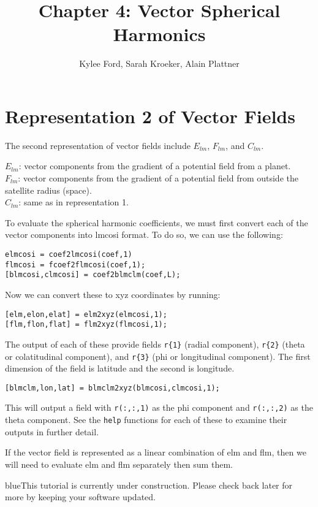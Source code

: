 \documentclass[11pt]{article}
\title{Chapter 4: Vector Spherical Harmonics}
\author{Kylee Ford, Sarah Kroeker, Alain Plattner}
\newcommand{\TAG}{\begin{color}{blue}This tutorial is currently under construction. Please check back later for more by keeping your software updated.\end{color}}
\begin{document}
\maketitle

\section{Representation 2 of Vector Fields}

The second representation of vector fields include $E_{lm}$, $F_{lm}$, and $C_{lm}$.

$E_{lm}$: vector components from the gradient of a potential field from a planet. \\
$F_{lm}$: vector components from the gradient of a potential field from outside the satellite radius (space). \\
$C_{lm}$: same as in representation 1.




To evaluate the spherical harmonic coefficients, we must first convert each of the vector components into lmcosi format.  To do so, we can use the following:

\verb|elmcosi = coef2lmcosi(coef,1)|\\
\verb|flmcosi = fcoef2flmcosi(coef,1);|\\
\verb|[blmcosi,clmcosi] = coef2blmclm(coef,L);|

Now we can convert these to xyz coordinates by running:

\verb|[elm,elon,elat] = elm2xyz(elmcosi,1);|\\
\verb|[flm,flon,flat] = flm2xyz(flmcosi,1);|

The output of each of these provide fields \verb|r{1}| (radial component), \verb|r{2}| (theta or colatitudinal component), and \verb|r{3}| (phi or longitudinal component).  The first dimension of the field is latitude and the second is longitude.

\verb|[blmclm,lon,lat] = blmclm2xyz(blmcosi,clmcosi,1);|

This will output a field with \verb|r(:,:,1)| as the phi component and \verb|r(:,:,2)| as the theta component.  See the \verb|help| functions for each of these to examine their outputs in further detail.


If the vector field is represented as a linear combination of elm and flm, then we will need to evaluate elm and flm separately then sum them.



\TAG
\end{document}
